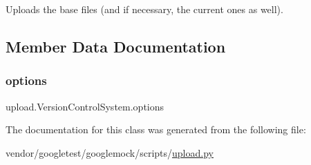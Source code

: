 \begin{DoxyVerb}Uploads the base files (and if necessary, the current ones as well).\end{DoxyVerb}
 

\subsection{Member Data Documentation}
\mbox{\label{classupload_1_1_version_control_system_a4d57d043bc408887b94269fe4cea9556}} 
\subsubsection{\texorpdfstring{options}{options}}
{\footnotesize\ttfamily upload.\+Version\+Control\+System.\+options}



The documentation for this class was generated from the following file\+:\begin{DoxyCompactItemize}
\item 
vendor/googletest/googlemock/scripts/\hyperlink{googlemock_2scripts_2upload_8py}{upload.\+py}\end{DoxyCompactItemize}
